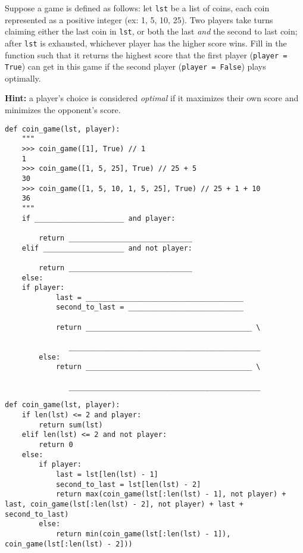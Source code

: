 \begin{blocksection}
\question Suppose a game is defined as follows: let \texttt{lst} be a list of coins, each coin represented as a positive integer (ex: 1, 5, 10, 25). Two players take turns claiming either the last coin in \texttt{lst}, or both the last \textit{and} the second to last coin; after \texttt{lst} is exhausted, whichever player has the higher score wins. Fill in the function such that it returns the highest score that the first player (\texttt{player = True}) can get in this game if the second player (\texttt{player = False}) plays optimally. 

\textbf{Hint:} a player's choice is considered \textit{optimal} if it maximizes their own score and minimizes the opponent's score.  \\

\begin{lstlisting}
def coin_game(lst, player):
    """
    >>> coin_game([1], True) // 1
    1
    >>> coin_game([1, 5, 25], True) // 25 + 5
    30
    >>> coin_game([1, 5, 10, 1, 5, 25], True) // 25 + 1 + 10
    36
    """
    if _____________________ and player:

        return _____________________________			
    elif ___________________ and not player:		

        return _____________________________			
    else:
	if player:			
            last = _____________________________________			
            second_to_last = ___________________________

            return _______________________________________ \

               _____________________________________________
        else:	
            return _______________________________________ \

               _____________________________________________
\end{lstlisting}
\end{blocksection}

\begin{solution}[0in]
\begin{lstlisting}
def coin_game(lst, player):
    if len(lst) <= 2 and player:
        return sum(lst)
    elif len(lst) <= 2 and not player:
        return 0
    else:
        if player:
            last = lst[len(lst) - 1]
            second_to_last = lst[len(lst) - 2]
            return max(coin_game(lst[:len(lst) - 1], not player) + last, coin_game(lst[:len(lst) - 2], not player) + last + second_to_last)
        else:
            return min(coin_game(lst[:len(lst) - 1]), coin_game(lst[:len(lst) - 2]))
\end{lstlisting}
\end{solution}



